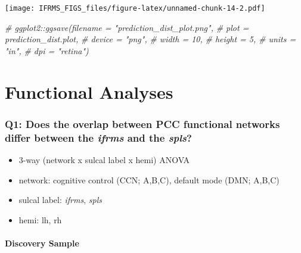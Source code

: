 \documentclass[
]{article}
\newenvironment{Shaded}{\begin{snugshade}}{\end{snugshade}}
\newcommand{\CommentTok}[1]{\textcolor[rgb]{0.56,0.35,0.01}{\textit{#1}}}
\providecommand{\tightlist}{%
  \setlength{\itemsep}{0pt}\setlength{\parskip}{0pt}}
\begin{document}
\texttt{[image: IFRMS\_FIGS\_files/figure-latex/unnamed-chunk-14-2.pdf]}

\begin{Shaded}
\begin{Highlighting}[]
\CommentTok{# ggplot2::ggsave(filename = "prediction_dist_plot.png",}
\CommentTok{#                 plot = prediction_dist.plot,}
\CommentTok{#                 device = "png",}
\CommentTok{#                 width = 10,}
\CommentTok{#                 height = 5, }
\CommentTok{#                 units = "in",}
\CommentTok{#                 dpi = "retina")}
\end{Highlighting}
\end{Shaded}

\hypertarget{functional-analyses}{%
\section{Functional Analyses}\label{functional-analyses}}

\hypertarget{q1-does-the-overlap-between-pcc-functional-networks-differ-between-the-ifrms-and-the-spls}{%
\subsubsection{\texorpdfstring{Q1: Does the overlap between PCC
functional networks differ between the \emph{ifrms} and the
\emph{spls}?}{Q1: Does the overlap between PCC functional networks differ between the ifrms and the spls?}}\label{q1-does-the-overlap-between-pcc-functional-networks-differ-between-the-ifrms-and-the-spls}}

\begin{itemize}
\tightlist
\item
  3-way (network x sulcal label x hemi) ANOVA
\item
  network: cognitive control (CCN; A,B,C), default mode (DMN; A,B,C)
\item
  sulcal label: \emph{ifrms}, \emph{spls}
\item
  hemi: lh, rh
\end{itemize}

\hypertarget{discovery-sample-3}{%
\paragraph{Discovery Sample}\label{discovery-sample-3}}
\end{document}
